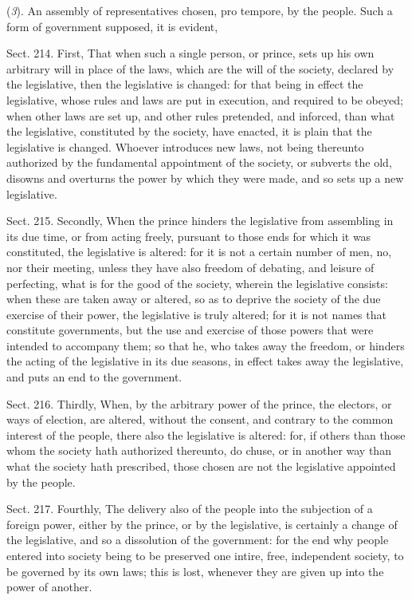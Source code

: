 \documentclass[11pt,openany]{book}
\begin{document}
(\emph{3}). An assembly of representatives chosen, pro tempore, by the people. Such a form of government supposed, it is evident,

Sect. 214. First, That when such a single person, or prince, sets up his own arbitrary will in place of the laws, which are the will of the society, declared by the legislative, then the legislative is changed: for that being in effect the legislative, whose rules and laws are put in execution, and required to be obeyed; when other laws are set up, and other rules pretended, and inforced, than what the legislative, constituted by the society, have enacted, it is plain that the legislative is changed. Whoever introduces new laws, not being thereunto authorized by the fundamental appointment of the society, or subverts the old, disowns and overturns the power by which they were made, and so sets up a new legislative.

Sect. 215. Secondly, When the prince hinders the legislative from assembling in its due time, or from acting freely, pursuant to those ends for which it was constituted, the legislative is altered: for it is not a certain number of men, no, nor their meeting, unless they have also freedom of debating, and leisure of perfecting, what is for the good of the society, wherein the legislative consists: when these are taken away or altered, so as to deprive the society of the due exercise of their power, the legislative is truly altered; for it is not names that constitute governments, but the use and exercise of those powers that were intended to accompany them; so that he, who takes away the freedom, or hinders the acting of the legislative in its due seasons, in effect takes away the legislative, and puts an end to the government.

Sect. 216. Thirdly, When, by the arbitrary power of the prince, the electors, or ways of election, are altered, without the consent, and contrary to the common interest of the people, there also the legislative is altered: for, if others than those whom the society hath authorized thereunto, do chuse, or in another way than what the society hath prescribed, those chosen are not the legislative appointed by the people.

Sect. 217. Fourthly, The delivery also of the people into the subjection of a foreign power, either by the prince, or by the legislative, is certainly a change of the legislative, and so a dissolution of the government: for the end why people entered into society being to be preserved one intire, free, independent society, to be governed by its own laws; this is lost, whenever they are given up into the power of another.
\end{document}
